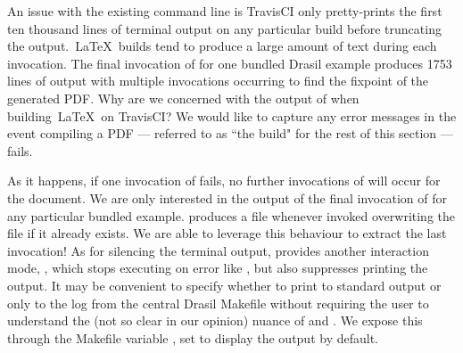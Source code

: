 {{{{{%
% 
% 

An issue with the existing command line is TravisCI only pretty-prints the first ten thousand lines of terminal output on any particular build before truncating the output.\ \LaTeX\ builds tend to produce a large amount of text during each invocation. The final invocation of  for one bundled Drasil example produces 1753 lines of output with multiple invocations occurring to find the fixpoint of the generated PDF. Why are we concerned with the output of  when building\ \LaTeX\ on TravisCI? We would like to capture any error messages in the event compiling a PDF --- referred to as ``the build" for the rest of this section --- fails.

As it happens, if one invocation of  fails, no further invocations of  will occur for the document. We are only interested in the output of the final invocation of  for any particular bundled example.  produces a  file whenever invoked overwriting the file if it already exists. We are able to leverage this behaviour to extract the last invocation! As for silencing the terminal output,  provides another interaction mode, , which stops executing on error like , but also suppresses printing the output. It may be convenient to specify whether to print to standard output or only to the log from the central Drasil Makefile without requiring the user to understand the (not so clear in our opinion) nuance of  and . We expose this through the Makefile variable , set to display the output by default.


}}}}}
